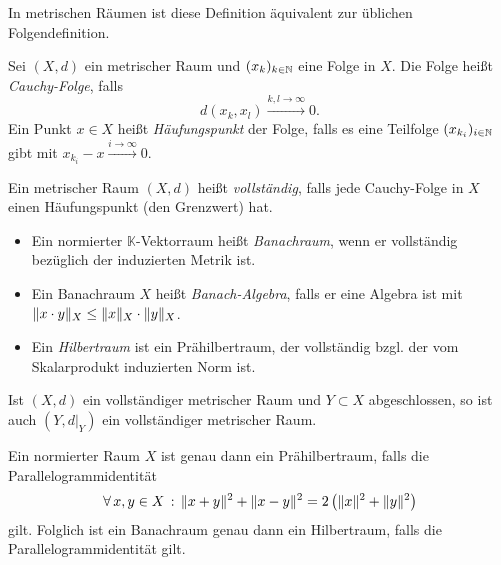 \documentclass{cheat-sheet}
\newcommand{\K}{\mathbb{K}}
\newcommand{\convWith}[1]{\xrightarrow{#1 \to \infty}} %
\begin{document}
\begin{bem}
  In metrischen Räumen ist diese Definition äquivalent zur üblichen Folgendefinition.
\end{bem}

\begin{definition}
  Sei $(X, d)$ ein metrischer Raum und $(x_k)_{k \in \mathbb{N}}$ eine Folge in $X$. Die Folge heißt \emph{Cauchy-Folge}, falls
  \[ d(x_k, x_l) \convWith{k, l} 0. \]
  Ein Punkt $x \in X$ heißt \emph{Häufungspunkt} der Folge, falls es eine Teilfolge $(x_{k_i})_{i \in \mathbb{N}}$ gibt mit $x_{k_i} - x \convWith{i} 0$.
\end{definition}

\begin{definition}
  Ein metrischer Raum $(X, d)$ heißt \emph{vollständig}, falls jede Cauchy-Folge in $X$ einen Häufungspunkt (den Grenzwert) hat.
\end{definition}

\begin{definition}
  \begin{itemize}
    \item Ein normierter $\K$-Vektorraum heißt \emph{Banachraum}, wenn er vollständig bezüglich der induzierten Metrik ist.
    \item Ein Banachraum $X$ heißt \emph{Banach-Algebra}, falls er eine Algebra ist mit $\lVert x \cdot y\rVert_X \leq \lVert x\rVert_X \cdot \lVert y\rVert_X$.
    \item Ein \emph{Hilbertraum} ist ein Prähilbertraum, der vollständig bzgl. der vom Skalarprodukt induzierten Norm ist.
  \end{itemize}
\end{definition}

\begin{lem}
  Ist $(X, d)$ ein vollständiger metrischer Raum und $Y \subset X$ abgeschlossen, so ist auch $(Y, d|_Y)$ ein vollständiger metrischer Raum.
\end{lem}


\begin{bem}
  Ein normierter Raum $X$ ist genau dann ein Prähilbertraum, falls die Parallelogrammidentität
  \[ \forall \, {x,y \in X} \,:\, \lVert x+y\rVert^2 + \lVert x-y\rVert^2 = 2 \left(\lVert x\rVert^2 + \lVert y\rVert^2\right) \]
  gilt. Folglich ist ein Banachraum genau dann ein Hilbertraum, falls die Parallelogrammidentität gilt.
\end{bem}

\end{document}
